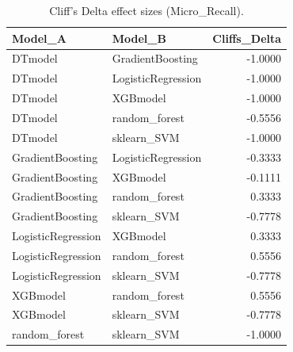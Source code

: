 \begin{table}[t]
\centering
\begin{tabular}{llr}
\toprule
Model_A & Model_B & Cliffs_Delta \\
\midrule
DTmodel & GradientBoosting & -1.0000 \\
DTmodel & LogisticRegression & -1.0000 \\
DTmodel & XGBmodel & -1.0000 \\
DTmodel & random_forest & -0.5556 \\
DTmodel & sklearn_SVM & -1.0000 \\
GradientBoosting & LogisticRegression & -0.3333 \\
GradientBoosting & XGBmodel & -0.1111 \\
GradientBoosting & random_forest & 0.3333 \\
GradientBoosting & sklearn_SVM & -0.7778 \\
LogisticRegression & XGBmodel & 0.3333 \\
LogisticRegression & random_forest & 0.5556 \\
LogisticRegression & sklearn_SVM & -0.7778 \\
XGBmodel & random_forest & 0.5556 \\
XGBmodel & sklearn_SVM & -0.7778 \\
random_forest & sklearn_SVM & -1.0000 \\
\bottomrule
\end{tabular}
\caption{Cliff's Delta effect sizes (Micro_Recall).}
\label{tab:cliffs_Micro_Recall}
\end{table}